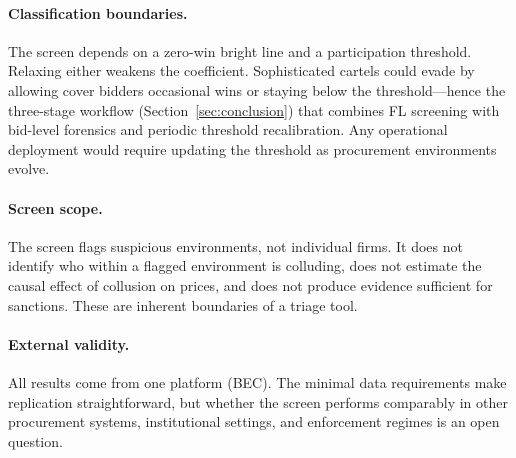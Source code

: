 \paragraph{Classification boundaries.}
The screen depends on a zero-win bright line and a participation
threshold. Relaxing either weakens the coefficient. Sophisticated
cartels could evade by allowing cover bidders occasional wins or
staying below the threshold---hence the three-stage workflow
(Section~\ref{sec:conclusion}) that combines FL screening with
bid-level forensics and periodic threshold recalibration. Any
operational deployment would require updating the threshold as
procurement environments evolve.

\paragraph{Screen scope.}
The screen flags suspicious environments, not individual firms. It
does not identify who within a flagged environment is colluding, does
not estimate the causal effect of collusion on prices, and does not
produce evidence sufficient for sanctions. These are inherent
boundaries of a triage tool.

\paragraph{External validity.}
All results come from one platform (BEC). The minimal data
requirements make replication straightforward, but whether the
screen performs comparably in other procurement systems, institutional
settings, and enforcement regimes is an open question.
